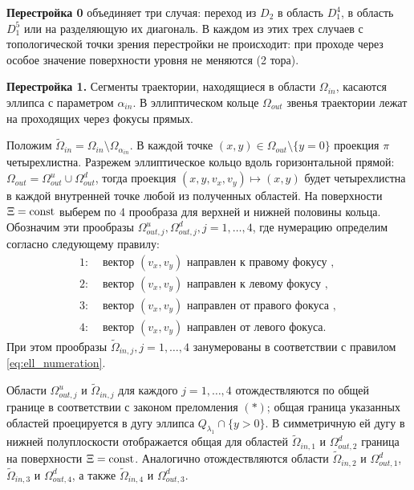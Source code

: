 \textbf{Перестройка 0} объединяет три случая: переход из $D_2$ в область $D_1^4$, в область $D_1^5$ или на разделяющую их диагональ.
В каждом из этих трех случаев с топологической точки зрения перестройки не происходит: при проходе через особое значение поверхности уровня не меняются (2 тора). 

\textbf{Перестройка 1.} 
Сегменты траектории, находящиеся в области $\Omega_{in}$, касаются эллипса с параметром $\alpha_{in}$. 
В эллиптическом кольце $\Omega_{out}$ звенья траектории лежат на проходящих через фокусы прямых.

Положим $\widetilde{\Omega}_{in} = \Omega_{in} \setminus \Omega_{\alpha_{in}}$. 
В каждой точке $(x,y) \in \Omega_{out} \setminus \{y=0\}$ проекция $\pi$ четырехлистна. Разрежем эллиптическое кольцо вдоль горизонтальной прямой: $\Omega_{out} = \Omega_{out}^u \cup \Omega_{out}^d$, тогда проекция $(x, y, v_x, v_y) \mapsto (x,y)$ будет четырехлистна в каждой внутренней точке любой из полученных областей.
На поверхности $\Xi = \mathrm{const}$ выберем по 4 прообраза для верхней и нижней половины кольца. Обозначим эти прообразы $\Omega_{out, j}^u, \Omega_{out, j}^d, j=1, \ldots, 4$, где нумерацию определим согласно следующему правилу:
\begin{equation}
\begin{array}{ll}
1: & \text{ вектор } (v_x, v_y) \text{ направлен к правому фокусу }, \\
2: & \text{ вектор } (v_x, v_y) \text{ направлен к левому фокусу }, \\
3: & \text{ вектор } (v_x, v_y) \text{ направлен от правого фокуса }, \\
4: & \text{ вектор } (v_x, v_y) \text{ направлен от левого фокуса}.
\end{array}
\label{eq:foc_numeration}
\end{equation}
При этом прообразы  $\widetilde{\Omega}_{in, j}, j=1, \ldots, 4$ занумерованы в соответствии с правилом \eqref{eq:ell_numeration}.

Области $\Omega_{out, j}^u$ и $\widetilde{\Omega}_{in, j}$ для каждого $j=1, \ldots, 4$ отождествляются по общей границе в соответствии с законом преломления $(\ast)$; общая граница указанных областей проецируется в дугу эллипса $Q_{\lambda_1} \cap \{y > 0\}$. 
В симметричную ей дугу в нижней полуплоскости отображается общая для областей $\widetilde{\Omega}_{in, 1}$ и $\Omega_{out, 2}^d$ граница на поверхности $\Xi = \mathrm{const}$. Аналогично отождествляются области $\widetilde{\Omega}_{in, 2}$ и $\Omega_{out, 1}^d$, $\widetilde{\Omega}_{in, 3}$ и $\Omega_{out, 4}^d$, а также $\widetilde{\Omega}_{in, 4}$ и $\Omega_{out, 3}^d$.

